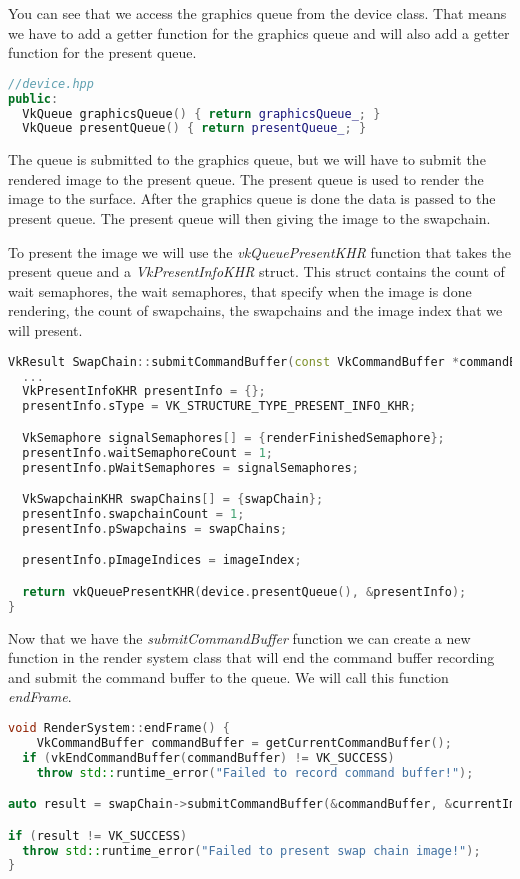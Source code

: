 \documentclass[12pt]{report} \usepackage{preamble}
\begin{document}
You can see that we access the graphics queue from the device class. That means we have to add a getter function for the graphics queue
and will also add a getter function for the present queue.

\begin{lstlisting}[language=C++]
//device.hpp
public:
  VkQueue graphicsQueue() { return graphicsQueue_; }
  VkQueue presentQueue() { return presentQueue_; }
\end{lstlisting}

The queue is submitted to the graphics queue, but we will have to submit the rendered image to the present queue. The present queue
is used to render the image to the surface. After the graphics queue is done the data is passed to the present queue. The present queue
will then giving the image to the swapchain.

To present the image we will use the \textit{vkQueuePresentKHR} function that takes the present queue and a \textit{VkPresentInfoKHR} struct.
This struct contains the count of wait semaphores, the wait semaphores, that specify when the image is done rendering, the count of swapchains,
the swapchains and the image index that we will present.

\begin{lstlisting}[language=C++]
VkResult SwapChain::submitCommandBuffer(const VkCommandBuffer *commandBuffer, uint32_t *imageIndex) {
  ...
  VkPresentInfoKHR presentInfo = {};
  presentInfo.sType = VK_STRUCTURE_TYPE_PRESENT_INFO_KHR;

  VkSemaphore signalSemaphores[] = {renderFinishedSemaphore};
  presentInfo.waitSemaphoreCount = 1;
  presentInfo.pWaitSemaphores = signalSemaphores;

  VkSwapchainKHR swapChains[] = {swapChain};
  presentInfo.swapchainCount = 1;
  presentInfo.pSwapchains = swapChains;

  presentInfo.pImageIndices = imageIndex;

  return vkQueuePresentKHR(device.presentQueue(), &presentInfo);
}
\end{lstlisting}

Now that we have the \textit{submitCommandBuffer} function we can create a new function in the render system class that will end the command buffer
recording and submit the command buffer to the queue. We will call this function \textit{endFrame}.

\begin{lstlisting}[language=C++]
void RenderSystem::endFrame() {
	VkCommandBuffer commandBuffer = getCurrentCommandBuffer();
  if (vkEndCommandBuffer(commandBuffer) != VK_SUCCESS)
    throw std::runtime_error("Failed to record command buffer!");

auto result = swapChain->submitCommandBuffer(&commandBuffer, &currentImageIndex);

if (result != VK_SUCCESS)
  throw std::runtime_error("Failed to present swap chain image!");
}
\end{lstlisting}
\end{document}
